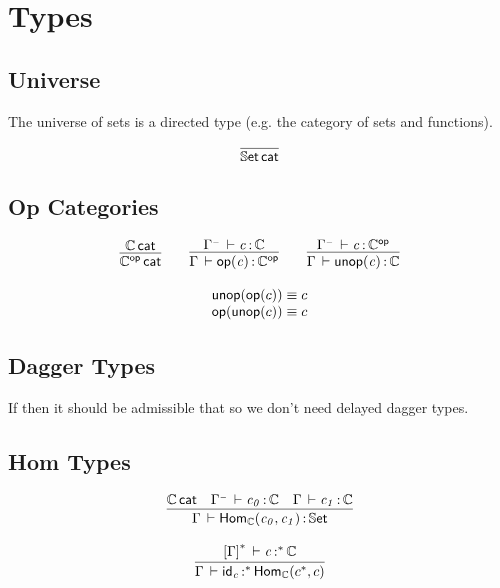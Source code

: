 \documentclass[11pt]{article}
\theoremstyle{plain}
\begin{document}
\section{Types}

\subsection{Universe}

The universe of sets is a directed type (e.g. the category of sets and
functions).

\[
\infer{\wfdtp{\types}}{}
\]


\subsection{Op Categories}

\[
\begin{array}{c}
\infer{\wfdtp{\optp{\C}}}
      {\wfdtp{\C}}
\qquad
\infer{\ofdtp{\Gamma}{\optm{c}}{\optp{\C}}}
      {\ofdtp{\Gamma^\con}{c}{\C}}
\qquad
\infer{\ofdtp{\Gamma}{\unop{c}}{{\C}}}
      {\ofdtp{\Gamma^\con}{c}{\optp{\C}}}
\\ \\
\unop{\optm{c}} \deq c \\
\optm{\unop{c}} \deq c
\end{array}
\]

\subsection{Dagger Types}

If  
then it should be admissible that
so we don't need delayed dagger types.  

\subsection{Hom Types}

\[
\begin{array}{c}
\infer{\ofdtp{\Gamma}{\Hom{\C}{c_0}{c_1}}{\types}}
      {\wfdtp{\C} &
        \oftp{\Gamma^\con}{c_0}{\C} & 
        \oftp{\Gamma}{c_1}{\C} 
      }
\\ \\
\infer{\oftpe{\Gamma}{\idm{c}}{\vcond}{\Hom{\C}{c^\vcond}{c}}}
      {\oftpe{\dupctx{\Gamma}{\vcond}}{c}{\vcond}{\C} 
      }
\end{array}
\]
\end{document}
